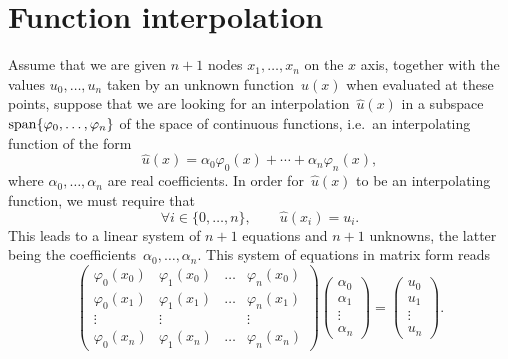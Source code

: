 \section{Function interpolation}
Assume that we are given $n+1$ nodes $x_1, \dotsc, x_n$ on the $x$ axis,
together with the values $u_0, \dotsc, u_n$ taken by an unknown function~$u(x)$ when evaluated at these points,
suppose that we are looking for an interpolation~$\widehat u(x)$ in a subspace~$\operatorname{span} \{\varphi_0, \dotsc, \varphi_n\}$
of the space of continuous functions, i.e.~an interpolating function of the form
\[
    \widehat u(x) = \alpha_0 \varphi_0(x) + \dotsb + \alpha_n \varphi_n(x),
\]
where $\alpha_0, \dotsc, \alpha_n$ are real coefficients.
In order for~$\widehat u(x)$ to be an interpolating function,
we must require that
\[
    \forall i \in \{0, \dotsc, n\}, \qquad
    \widehat u(x_i) = u_i.
\]
This leads to a linear system of $n+1$ equations and $n+1$ unknowns,
the latter being the coefficients~$\alpha_0, \dotsc, \alpha_n$.
This system of equations in matrix form reads
\begin{equation}
    \label{eq:linear_system_interpolation}
    \begin{pmatrix}
        \varphi_0(x_0) & \varphi_1(x_0) & \hdots & \varphi_n(x_0) \\
        \varphi_0(x_1) & \varphi_1(x_1) & \hdots & \varphi_n(x_1) \\
        \vdots & \vdots & & \vdots \\
        \varphi_0(x_n) & \varphi_1(x_n) & \hdots & \varphi_n(x_n)
    \end{pmatrix}
    \begin{pmatrix}
        \alpha_0 \\
        \alpha_1 \\
        \vdots \\
        \alpha_n
    \end{pmatrix}
    =
    \begin{pmatrix}
        u_0 \\
        u_1 \\
        \vdots \\
        u_n
    \end{pmatrix}.
\end{equation}

